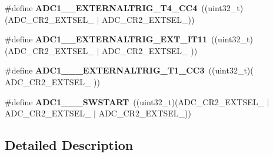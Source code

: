\begin{DoxyCompactItemize}
\item 
\mbox{\label{group___a_d_c_ex___internal___h_a_l__driver___ext__trig__src___regular_ga3d6eef4340707c90a8a03f13915fe33b}} 
\#define {\bfseries A\+D\+C1\+\_\+\_\+\+E\+X\+T\+E\+R\+N\+A\+L\+T\+R\+I\+G\+\_\+\+T4\+\_\+\+C\+C4}~((uint32\+\_\+t)(A\+D\+C\+\_\+\+C\+R2\+\_\+\+E\+X\+T\+S\+E\+L\+\_ $\vert$                    A\+D\+C\+\_\+\+C\+R2\+\_\+\+E\+X\+T\+S\+E\+L\+\_))
\item 
\mbox{\label{group___a_d_c_ex___internal___h_a_l__driver___ext__trig__src___regular_gadfcac1a0321bd4432987ac219f6bb910}} 
\#define {\bfseries A\+D\+C1\+\_\+\_\+\+E\+X\+T\+E\+R\+N\+A\+L\+T\+R\+I\+G\+\_\+\+E\+X\+T\+\_\+\+I\+T11}~((uint32\+\_\+t)(A\+D\+C\+\_\+\+C\+R2\+\_\+\+E\+X\+T\+S\+E\+L\+\_ $\vert$ A\+D\+C\+\_\+\+C\+R2\+\_\+\+E\+X\+T\+S\+E\+L\+\_                   ))
\item 
\mbox{\label{group___a_d_c_ex___internal___h_a_l__driver___ext__trig__src___regular_gaa2365f240e11b187842056429aa59dc0}} 
\#define {\bfseries A\+D\+C1\+\_\+\_\+\_\+\+E\+X\+T\+E\+R\+N\+A\+L\+T\+R\+I\+G\+\_\+\+T1\+\_\+\+C\+C3}~((uint32\+\_\+t)(                   A\+D\+C\+\_\+\+C\+R2\+\_\+\+E\+X\+T\+S\+E\+L\+\_                   ))
\item 
\mbox{\label{group___a_d_c_ex___internal___h_a_l__driver___ext__trig__src___regular_gacdbff56063c173892cb85570e6075eca}} 
\#define {\bfseries A\+D\+C1\+\_\+\_\+\_\+\+S\+W\+S\+T\+A\+RT}~((uint32\+\_\+t)(A\+D\+C\+\_\+\+C\+R2\+\_\+\+E\+X\+T\+S\+E\+L\+\_ $\vert$ A\+D\+C\+\_\+\+C\+R2\+\_\+\+E\+X\+T\+S\+E\+L\+\_ $\vert$ A\+D\+C\+\_\+\+C\+R2\+\_\+\+E\+X\+T\+S\+E\+L\+\_))
\end{DoxyCompactItemize}


\subsection{Detailed Description}
